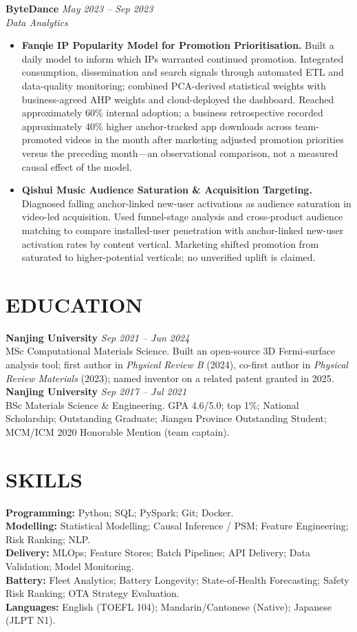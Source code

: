 \documentclass[a4paper,10pt]{article}
\begin{document}
\textbf{ByteDance} \hfill \textit{May 2023 -- Sep 2023}\\
\textit{Data Analytics}
\begin{itemize}
\item \textbf{Fanqie IP Popularity Model for Promotion Prioritisation.} Built a daily model to inform which IPs warranted continued promotion. Integrated consumption, dissemination and search signals through automated ETL and data-quality monitoring; combined PCA-derived statistical weights with business-agreed AHP weights and cloud-deployed the dashboard. Reached approximately 60\% internal adoption; a business retrospective recorded approximately 40\% higher anchor-tracked app downloads across team-promoted videos in the month after marketing adjusted promotion priorities versus the preceding month---an observational comparison, not a measured causal effect of the model.
\item \textbf{Qishui Music Audience Saturation \& Acquisition Targeting.} Diagnosed falling anchor-linked new-user activations as audience saturation in video-led acquisition. Used funnel-stage analysis and cross-product audience matching to compare installed-user penetration with anchor-linked new-user activation rates by content vertical. Marketing shifted promotion from saturated to higher-potential verticals; no unverified uplift is claimed.
\end{itemize}

\section{EDUCATION}
\textbf{Nanjing University} \hfill \textit{Sep 2021 -- Jun 2024}\\
MSc Computational Materials Science. Built an open-source 3D Fermi-surface analysis tool; first author in \textit{Physical Review B} (2024), co-first author in \textit{Physical Review Materials} (2023); named inventor on a related patent granted in 2025.\\[1pt]
\textbf{Nanjing University} \hfill \textit{Sep 2017 -- Jul 2021}\\
BSc Materials Science \& Engineering. GPA 4.6/5.0; top 1\%; National Scholarship; Outstanding Graduate; Jiangsu Province Outstanding Student; MCM/ICM 2020 Honorable Mention (team captain).

\section{SKILLS}
\textbf{Programming:} Python; SQL; PySpark; Git; Docker.\\[1pt]
\textbf{Modelling:} Statistical Modelling; Causal Inference / PSM; Feature Engineering; Risk Ranking; NLP.\\[1pt]
\textbf{Delivery:} MLOps; Feature Stores; Batch Pipelines; API Delivery; Data Validation; Model Monitoring.\\[1pt]
\textbf{Battery:} Fleet Analytics; Battery Longevity; State-of-Health Forecasting; Safety Risk Ranking; OTA Strategy Evaluation.\\[1pt]
\textbf{Languages:} English (TOEFL 104); Mandarin/Cantonese (Native); Japanese (JLPT N1).
\end{document}
